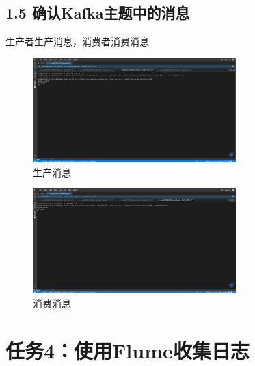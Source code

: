 \documentclass{article}
\begin{document}
\subsection*{1.5 确认Kafka主题中的消息}
生产者生产消息，消费者消费消息
\begin{figure}[H]
    \centering
    \includegraphics[width=0.7\textwidth]{./pic/8.png}
    \caption{生产消息}
\end{figure}
\begin{figure}[H]
    \centering
    \includegraphics[width=0.7\textwidth]{./pic/9.png}
    \caption{消费消息}
\end{figure}

\section{任务4：使用Flume收集日志}
\end{document}
